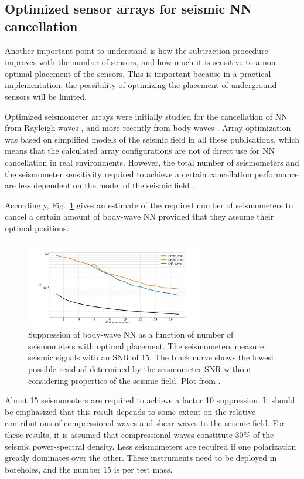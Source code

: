 \subsection{Optimized sensor arrays for seismic NN cancellation}
\label{sub:optimization}

Another important point to understand is how the subtraction procedure improves with the number of sensors, and how much it is sensitive to a non optimal placement of the sensors. This is important because in a practical implementation, the possibility of optimizing the placement of underground sensors will be limited. 

Optimized seismometer arrays were initially studied for the cancellation of NN from Rayleigh waves \cite{DHA2012,Har2015,CoEA2016a}, and more recently from body waves \cite{BaHa2019}. Array optimization was based on simplified models of the seismic field in all these publications, which means that the calculated array configurations are not of direct use for NN cancellation in real environments. However, the total number of seismometers and the seismometer sensitivity required to achieve a certain cancellation performance are less dependent on the model of the seismic field \cite{CoEA2016a}. 

Accordingly, Fig.~\ref{fig:residualN} gives an estimate of the required number of seismometers to cancel a certain amount of body-wave NN provided that they assume their optimal positions. 
\begin{figure}[t!]
	\begin{center} 
		\includegraphics[width=0.7\textwidth]{./Detector/NewtonianNoise/NewtonianNoiseFigures/SNR_ch3.png} 
		\caption{Suppression of body-wave NN as a function of number of seismometers with optimal placement. The seismometers measure seismic signals with an SNR of 15. The black curve shows the lowest possible residual determined by the seismometer SNR without considering properties of the seismic field. Plot from \cite{BaHa2019}.} 
		 \label{fig:residualN} 
	\end{center}
\end{figure}
About 15 seismometers are required to achieve a factor 10 suppression. It should be emphasized that this result depends to some extent on the relative contributions of compressional waves and shear waves to the seismic field. For these results, it is assumed that compressional waves constitute 30\% of the seismic power-spectral density. Less seismometers are required if one polarization greatly dominates over the other. These instruments need to be deployed in boreholes, and the number 15 is per test mass. 

